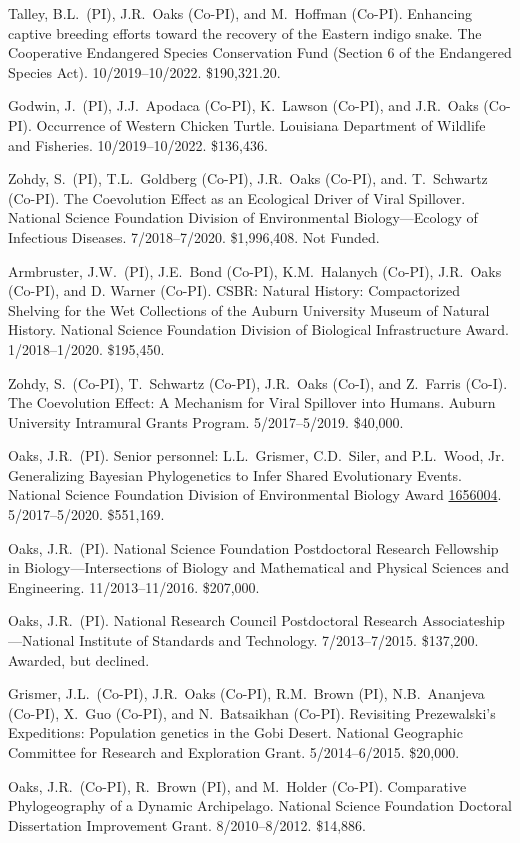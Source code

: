 \myHangIndent
Talley, B.L.\ (PI),
J.R.\ Oaks (Co-PI),
and
M.\ Hoffman (Co-PI).
Enhancing captive breeding efforts toward the recovery of the Eastern indigo snake.
The Cooperative Endangered Species Conservation Fund (Section 6 of the
Endangered Species Act).
10/2019--10/2022.
\$190,321.20.

\myHangIndent
Godwin, J.\ (PI),
J.J.\ Apodaca (Co-PI),
K.\ Lawson (Co-PI),
and
J.R.\ Oaks (Co-PI).
Occurrence of Western Chicken Turtle.
Louisiana Department of Wildlife and Fisheries.
10/2019--10/2022.
\$136,436.

\myHangIndent
Zohdy, S.\ (PI),
T.L.\ Goldberg (Co-PI),
J.R.\ Oaks (Co-PI), and.
T.\ Schwartz (Co-PI).
The Coevolution Effect as an Ecological Driver of Viral Spillover.
National Science Foundation Division of Environmental Biology---Ecology of Infectious Diseases.
7/2018--7/2020.
\$1,996,408.
Not Funded.

\myHangIndent
Armbruster, J.W.\ (PI),
J.E.\ Bond (Co-PI),
K.M.\ Halanych (Co-PI),
J.R.\ Oaks (Co-PI),
and
D. Warner (Co-PI).
CSBR: Natural History: Compactorized Shelving for the Wet Collections of the
Auburn University Museum of Natural History.
National Science Foundation Division of Biological Infrastructure Award.
1/2018--1/2020.
\$195,450.

\myHangIndent
Zohdy, S.\ (Co-PI), T.\ Schwartz (Co-PI), J.R.\ Oaks (Co-I), and Z.\ Farris (Co-I).
The Coevolution Effect: A Mechanism for Viral Spillover into Humans.
Auburn University Intramural Grants Program.
5/2017--5/2019.
\$40,000.

\myHangIndent
Oaks, J.R.\ (PI).
Senior personnel: L.L.\ Grismer, C.D.\ Siler, and P.L.\ Wood, Jr.
Generalizing Bayesian Phylogenetics to Infer Shared Evolutionary Events.
National Science Foundation Division of Environmental Biology Award
\href{https://www.nsf.gov/awardsearch/showAward?AWD_ID=1656004&HistoricalAwards=false}{1656004}.
5/2017--5/2020.
\$551,169.

\myHangIndent
Oaks, J.R.\ (PI).
National Science Foundation Postdoctoral Research Fellowship in
Biology---Intersections of Biology and Mathematical and Physical Sciences and
Engineering.
11/2013--11/2016.
\$207,000.

\myHangIndent
Oaks, J.R.\ (PI).
National Research Council Postdoctoral Research Associateship---National
Institute of Standards and Technology.
7/2013--7/2015.
\$137,200.
Awarded, but declined.

\myHangIndent
Grismer, J.L.\ (Co-PI), J.R.\ Oaks (Co-PI), R.M.\ Brown (PI), N.B.\ Ananjeva
(Co-PI), X.\ Guo (Co-PI), and N.\ Batsaikhan (Co-PI).
Revisiting Prezewalski's Expeditions: Population genetics in the Gobi Desert.
National Geographic Committee for Research and Exploration Grant.
5/2014--6/2015.
\$20,000.

\myHangIndent
Oaks, J.R.\ (Co-PI), R.\ Brown (PI), and M.\ Holder (Co-PI).
Comparative Phylogeography of a Dynamic Archipelago.
National Science Foundation Doctoral Dissertation Improvement Grant.
8/2010--8/2012.
\$14,886.
